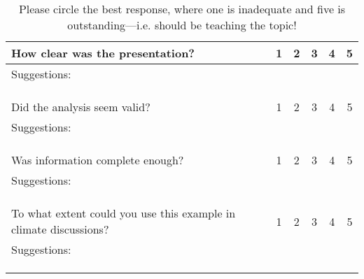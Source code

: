 \documentclass{article}\usepackage[]{graphicx}\usepackage[]{color}
\begin{document}
\begin{table}[ht!]
\caption{Please circle the best response, where one is inadequate and five is outstanding---i.e. should be teaching the topic!}
\begin{tabular}{|p{4in}|ccccc|}\hline
How clear was the presentation?     & 1 & 2 & 3 & 4 & 5 \\ \hline
Suggestions: &&&&& \\ &&&&& \\ &&&&& \\
&&&&& \\ \hline
Did the analysis seem valid?        & 1 & 2 & 3 & 4 & 5 \\ \hline
Suggestions: &&&&& \\ &&&&& \\ &&&&& \\
&&&&& \\ \hline
Was information complete enough?            & 1 & 2 & 3 & 4 & 5 \\ \hline
Suggestions: &&&&& \\ &&&&& \\ &&&&& \\
&&&&& \\ \hline
To what extent could you use this example in climate discussions?            & 1 & 2 & 3 & 4 & 5 \\ \hline
Suggestions: &&&&& \\ &&&&& \\ &&&&& \\
&&&&& \\ \hline
\end{tabular}
\end{table}
\end{document}
